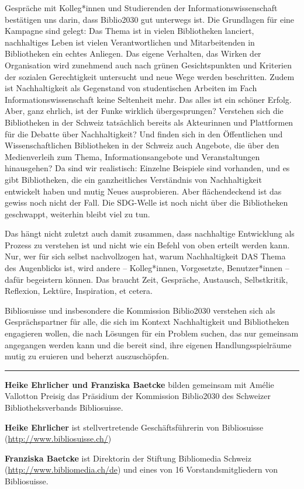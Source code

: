 \documentclass[a4paper,
fontsize=11pt,
oneside,
numbers=noperiodatend,
parskip=half-,
bibliography=totoc,
final
]{scrartcl}
\begin{document}
Gespräche mit Kolleg*innen und Studierenden der Informationswissenschaft
bestätigen uns darin, dass Biblio2030 gut unterwegs ist. Die Grundlagen
für eine Kampagne sind gelegt: Das Thema ist in vielen Bibliotheken
lanciert, nachhaltiges Leben ist vielen Verantwortlichen und
Mitarbeitenden in Bibliotheken ein echtes Anliegen. Das eigene
Verhalten, das Wirken der Organisation wird zunehmend auch nach grünen
Gesichtspunkten und Kriterien der sozialen Gerechtigkeit untersucht und
neue Wege werden beschritten. Zudem ist Nachhaltigkeit als Gegenstand
von studentischen Arbeiten im Fach Informationswissenschaft keine
Seltenheit mehr. Das alles ist ein schöner Erfolg. Aber, ganz ehrlich,
ist der Funke wirklich übergesprungen? Verstehen sich die Bibliotheken
in der Schweiz tatsächlich bereits als Akteurinnen und Plattformen für
die Debatte über Nachhaltigkeit? Und finden sich in den Öffentlichen und
Wissenschaftlichen Bibliotheken in der Schweiz auch Angebote, die über
den Medienverleih zum Thema, Informationsangebote und Veranstaltungen
hinausgehen? Da sind wir realistisch: Einzelne Beispiele sind vorhanden,
und es gibt Bibliotheken, die ein ganzheitliches Verständnis von
Nachhaltigkeit entwickelt haben und mutig Neues ausprobieren. Aber
flächendeckend ist das gewiss noch nicht der Fall. Die SDG-Welle ist
noch nicht über die Bibliotheken geschwappt, weiterhin bleibt viel zu
tun.

Das hängt nicht zuletzt auch damit zusammen, dass nachhaltige
Entwicklung als Prozess zu verstehen ist und nicht wie ein Befehl von
oben erteilt werden kann. Nur, wer für sich selbst nachvollzogen hat,
warum Nachhaltigkeit DAS Thema des Augenblicks ist, wird andere --
Kolleg*innen, Vorgesetzte, Benutzer*innen -- dafür begeistern können.
Das braucht Zeit, Gespräche, Austausch, Selbstkritik, Reflexion,
Lektüre, Inspiration, et cetera.

Bibliosuisse und insbesondere die Kommission Biblio2030 verstehen sich
als Gesprächspartner für alle, die sich im Kontext Nachhaltigkeit und
Bibliotheken engagieren wollen, die nach Lösungen für ein Problem
suchen, das nur gemeinsam angegangen werden kann und die bereit sind,
ihre eigenen Handlungsspielräume mutig zu eruieren und beherzt
auszuschöpfen.

\begin{center}\rule{0.5\linewidth}{0.5pt}\end{center}

\textbf{Heike Ehrlicher und Franziska Baetcke} bilden gemeinsam mit
Amélie Vallotton Preisig das Präsidium der Kommission Biblio2030 des
Schweizer Bibliotheksverbands Bibliosuisse.

\textbf{Heike Ehrlicher} ist stellvertretende Geschäftsführerin von
Bibliosuisse (\url{http://www.bibliosuisse.ch/})

\textbf{Franziska Baetcke} ist Direktorin der Stiftung Bibliomedia
Schweiz (\url{http://www.bibliomedia.ch/de}) und eines von 16
Vorstandsmitgliedern von Bibliosuisse.
\end{document}
